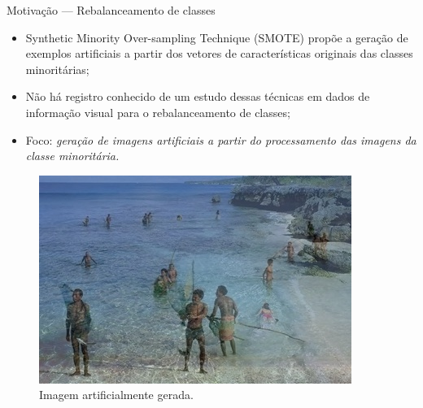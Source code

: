 \documentclass{beamer}
\begin{document}
\begin{frame}{Motivação --- Rebalanceamento de classes}
  \setlength\leftmargini{1em}
  \justifying
  \begin{itemize}
    \item Synthetic Minority Over-sampling Technique (SMOTE) propõe a geração de exemplos artificiais a partir dos vetores de características originais das classes minoritárias;
    \item Não há registro conhecido de um estudo dessas técnicas em dados de informação visual para o rebalanceamento de classes;
    \item Foco: \textit{geração de imagens artificiais a partir do processamento das imagens da classe minoritária.}
  \end{itemize}
  \begin{figure}[htbp]
    \begin{center}
      \includegraphics[width=.3\linewidth]{figuras/imagemgerada.jpg}
      \caption{Imagem artificialmente gerada.}
    \end{center}
  \end{figure}
\end{frame}
\end{document}
